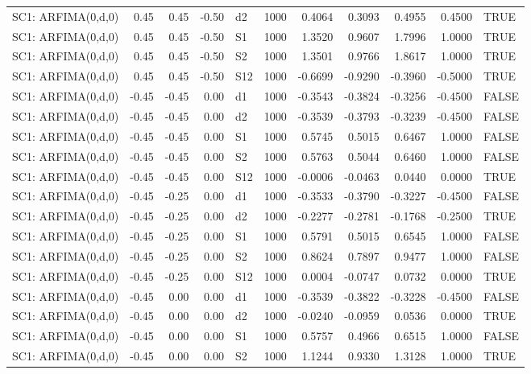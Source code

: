 \begin{table}[ht]
\begin{tabular}{lrrrlrrrrrl}
  SC1: ARFIMA(0,d,0) & 0.45 & 0.45 & -0.50 & d2 & 1000 & 0.4064 & 0.3093 & 0.4955 & 0.4500 & TRUE \\ 
  SC1: ARFIMA(0,d,0) & 0.45 & 0.45 & -0.50 & S1 & 1000 & 1.3520 & 0.9607 & 1.7996 & 1.0000 & TRUE \\ 
  SC1: ARFIMA(0,d,0) & 0.45 & 0.45 & -0.50 & S2 & 1000 & 1.3501 & 0.9766 & 1.8617 & 1.0000 & TRUE \\ 
  SC1: ARFIMA(0,d,0) & 0.45 & 0.45 & -0.50 & S12 & 1000 & -0.6699 & -0.9290 & -0.3960 & -0.5000 & TRUE \\ 
  SC1: ARFIMA(0,d,0) & -0.45 & -0.45 & 0.00 & d1 & 1000 & -0.3543 & -0.3824 & -0.3256 & -0.4500 & FALSE \\ 
  SC1: ARFIMA(0,d,0) & -0.45 & -0.45 & 0.00 & d2 & 1000 & -0.3539 & -0.3793 & -0.3239 & -0.4500 & FALSE \\ 
  SC1: ARFIMA(0,d,0) & -0.45 & -0.45 & 0.00 & S1 & 1000 & 0.5745 & 0.5015 & 0.6467 & 1.0000 & FALSE \\ 
  SC1: ARFIMA(0,d,0) & -0.45 & -0.45 & 0.00 & S2 & 1000 & 0.5763 & 0.5044 & 0.6460 & 1.0000 & FALSE \\ 
  SC1: ARFIMA(0,d,0) & -0.45 & -0.45 & 0.00 & S12 & 1000 & -0.0006 & -0.0463 & 0.0440 & 0.0000 & TRUE \\ 
  SC1: ARFIMA(0,d,0) & -0.45 & -0.25 & 0.00 & d1 & 1000 & -0.3533 & -0.3790 & -0.3227 & -0.4500 & FALSE \\ 
  SC1: ARFIMA(0,d,0) & -0.45 & -0.25 & 0.00 & d2 & 1000 & -0.2277 & -0.2781 & -0.1768 & -0.2500 & TRUE \\ 
  SC1: ARFIMA(0,d,0) & -0.45 & -0.25 & 0.00 & S1 & 1000 & 0.5791 & 0.5015 & 0.6545 & 1.0000 & FALSE \\ 
  SC1: ARFIMA(0,d,0) & -0.45 & -0.25 & 0.00 & S2 & 1000 & 0.8624 & 0.7897 & 0.9477 & 1.0000 & FALSE \\ 
  SC1: ARFIMA(0,d,0) & -0.45 & -0.25 & 0.00 & S12 & 1000 & 0.0004 & -0.0747 & 0.0732 & 0.0000 & TRUE \\ 
  SC1: ARFIMA(0,d,0) & -0.45 & 0.00 & 0.00 & d1 & 1000 & -0.3539 & -0.3822 & -0.3228 & -0.4500 & FALSE \\ 
  SC1: ARFIMA(0,d,0) & -0.45 & 0.00 & 0.00 & d2 & 1000 & -0.0240 & -0.0959 & 0.0536 & 0.0000 & TRUE \\ 
  SC1: ARFIMA(0,d,0) & -0.45 & 0.00 & 0.00 & S1 & 1000 & 0.5757 & 0.4966 & 0.6515 & 1.0000 & FALSE \\ 
  SC1: ARFIMA(0,d,0) & -0.45 & 0.00 & 0.00 & S2 & 1000 & 1.1244 & 0.9330 & 1.3128 & 1.0000 & TRUE \\ 

\end{tabular}
\end{table}
